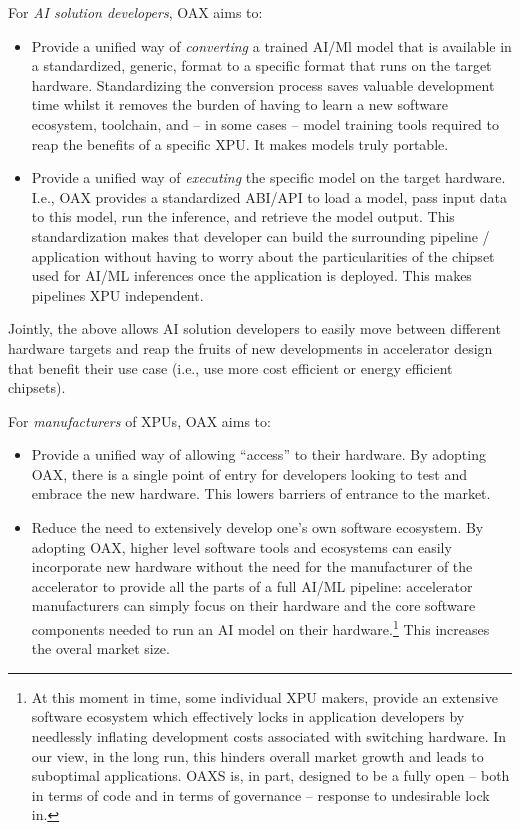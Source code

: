 \documentclass{article}
\begin{document}
For \emph{AI solution developers}, OAX aims to:
\begin{itemize}
\item Provide a unified way of \emph{converting} a trained AI/Ml model that is available in a standardized, generic, format to a specific format that runs on the target hardware. Standardizing the conversion process saves valuable development time whilst it removes the burden of having to learn a new software ecosystem, toolchain, and -- in some cases -- model training tools required to reap the benefits of a specific XPU. It makes models truly portable.
\item Provide a unified way of \emph{executing} the specific model on the target hardware. I.e., OAX provides a standardized ABI/API to load a model, pass input data to this model, run the inference, and retrieve the model output. This standardization makes that developer can build the surrounding pipeline / application without having to worry about the particularities of the chipset used for AI/ML inferences once the application is deployed. This makes pipelines XPU independent.
\end{itemize}

Jointly, the above allows AI solution developers to easily move between different hardware targets and reap the fruits of new developments in accelerator design that benefit their use case (i.e., use more cost efficient or energy efficient chipsets).

For \emph{manufacturers} of XPUs, OAX aims to:
\begin{itemize}
\item Provide a unified way of allowing ``access'' to their hardware. By adopting OAX, there is a single point of entry for developers looking to test and embrace the new hardware. This lowers barriers of entrance to the market.
\item Reduce the need to extensively develop one's own software ecosystem. By adopting OAX, higher level software tools and ecosystems can easily incorporate new hardware without the need for the manufacturer of the accelerator to provide all the parts of a full AI/ML pipeline: accelerator manufacturers can simply focus on their hardware and the core software components needed to run an AI model on their hardware.\footnote{At this moment in time, some individual XPU makers, provide an extensive software ecosystem which effectively locks in application developers by needlessly inflating development costs associated with switching hardware. In our view, in the long run, this hinders overall market growth and leads to suboptimal applications. OAXS is, in part, designed to be a fully open -- both in terms of code and in terms of governance -- response to undesirable lock in.} This increases the overal market size.
\end{itemize}
\end{document}
